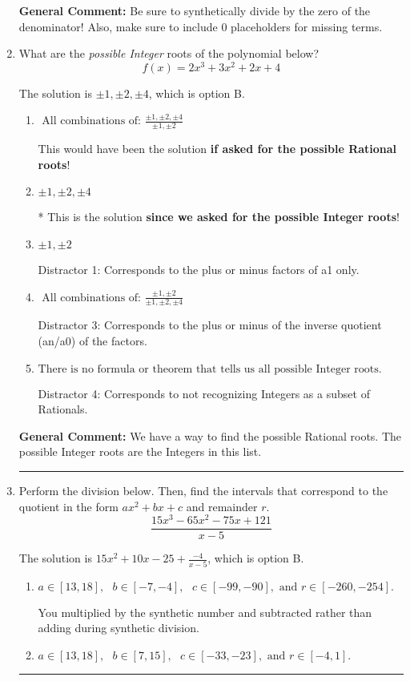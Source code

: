\documentclass{extbook}[14pt]
\newcommand{\litem}[1]{\item #1

\rule{\textwidth}{0.4pt}}
\begin{document}
\begin{enumerate}
{\textbf{General Comment:} Be sure to synthetically divide by the zero of the denominator! Also, make sure to include 0 placeholders for missing terms.
}
\litem{
What are the \textit{possible Integer} roots of the polynomial below?
\[ f(x) = 2x^{3} +3 x^{2} +2 x + 4 \]

The solution is \( \pm 1,\pm 2,\pm 4 \), which is option B.\begin{enumerate}[label=\Alph*.]
\item \( \text{ All combinations of: }\frac{\pm 1,\pm 2,\pm 4}{\pm 1,\pm 2} \)

This would have been the solution \textbf{if asked for the possible Rational roots}!
\item \( \pm 1,\pm 2,\pm 4 \)

* This is the solution \textbf{since we asked for the possible Integer roots}!
\item \( \pm 1,\pm 2 \)

 Distractor 1: Corresponds to the plus or minus factors of a1 only.
\item \( \text{ All combinations of: }\frac{\pm 1,\pm 2}{\pm 1,\pm 2,\pm 4} \)

 Distractor 3: Corresponds to the plus or minus of the inverse quotient (an/a0) of the factors. 
\item \( \text{There is no formula or theorem that tells us all possible Integer roots.} \)

 Distractor 4: Corresponds to not recognizing Integers as a subset of Rationals.
\end{enumerate}

\textbf{General Comment:} We have a way to find the possible Rational roots. The possible Integer roots are the Integers in this list.
}
\litem{
Perform the division below. Then, find the intervals that correspond to the quotient in the form $ax^2+bx+c$ and remainder $r$.
\[ \frac{15x^{3} -65 x^{2} -75 x + 121}{x -5} \]

The solution is \( 15x^{2} +10 x -25 + \frac{-4}{x -5} \), which is option B.\begin{enumerate}[label=\Alph*.]
\item \( a \in [13, 18], \text{   } b \in [-7, -4], \text{   } c \in [-99, -90], \text{   and   } r \in [-260, -254]. \)

 You multiplied by the synthetic number and subtracted rather than adding during synthetic division.
\item \( a \in [13, 18], \text{   } b \in [7, 15], \text{   } c \in [-33, -23], \text{   and   } r \in [-4, 1]. \)


\end{enumerate}}
\end{enumerate}
\end{document}

